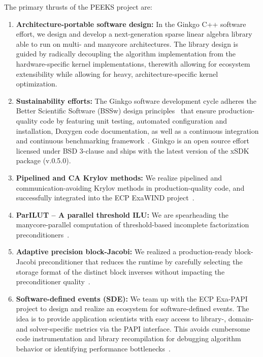 The primary thrusts of the PEEKS project are:
\begin{enumerate}
    \item \textbf{Architecture-portable software design:}
	In the Ginkgo C++ software effort, we design and develop a next-generation 
	sparse linear algebra library able to run on multi- and manycore 
	architectures. The library design is guided by radically decoupling the 
	algorithm implementation from the hardware-specific kernel implementations, 
	therewith allowing for ecosystem extensibility while allowing for heavy, 
	architecture-specific kernel optimization. 
	\item \textbf{Sustainability efforts:}
	The Ginkgo software development cycle adheres the Better Scientific 
	Software (BSSw) design principles~\cite{betterscientificsoftware} that 
	ensure production-quality code by featuring unit testing, automated 
	configuration and installation, Doxygen code documentation, as well as a 
	continuous integration and continuous benchmarking 
	framework~\cite{pasc_anzt}. Ginkgo is an 
	open source effort licensed under BSD 3-clause and ships with the latest 
	version of the xSDK package (v.0.5.0). 
	\item \textbf{Pipelined and CA Krylov methods:} 
    We realize pipelined and 
	communication-avoiding Krylov methods in production-quality code, and 
	successfully integrated into the ECP ExaWIND 
	project~\cite{cakrylovexawind}. 
	\item \textbf{ParILUT -- A parallel threshold ILU:}  We are spearheading 
	the manycore-parallel computation of threshold-based 
	incomplete factorization preconditioners~\cite{sisc_anzt,ipdps_anzt}. 
	\item \textbf{Adaptive precision block-Jacobi:}  We realized a 
	production-ready block-Jacobi preconditioner that reduces the runtime by 
	carefully selecting the storage format of the distinct block inverses 
	without impacting the preconditioner quality~\cite{toms_anzt}. 
    \item \textbf{Software-defined events (SDE):}  We team up with the ECP 
    Exa-PAPI project to design and realize an ecosystem for software-defined 
    events. The idea is to provide application scientists with easy access 
    to library-, domain- and solver-specific metrics via the PAPI interface. 
    This avoids cumbersome code instrumentation and library recompilation for 
    debugging algorithm behavior or identifying performance 
    bottlenecks~\cite{doi:10.1177/1094342019846287}. 
\end{enumerate}

